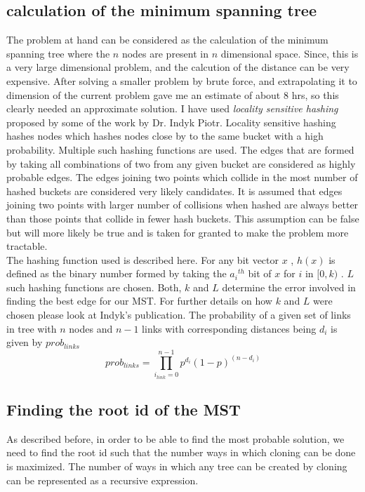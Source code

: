 \documentclass[12pt]{article}
\begin{document}
\subsection{calculation of the minimum spanning tree}
The problem at hand can be considered as the calculation of the minimum spanning tree where the $n$ nodes are present in $n$ dimensional space. Since, this is a very large dimensional problem, and the calcution of the distance can be very expensive. After solving a smaller problem by brute force, and extrapolating it to dimension of the current problem gave me an estimate of about 8 hrs, so this clearly needed an approximate solution. I have used \emph{locality sensitive hashing} proposed by some of the work by Dr. Indyk Piotr. Locality sensitive hashing hashes nodes which hashes nodes close by to the same bucket with a high probability. Multiple such hashing functions are used. The edges that are formed by taking all combinations of two from any given bucket are considered as highly probable edges. The edges joining two points which collide in the most number of hashed buckets are considered very likely candidates. It is assumed that edges joining two points with larger number of collisions when hashed are always better than those points that collide in fewer hash buckets. This assumption can be false but will more likely be true and is taken for granted to make the problem more tractable. \\

The hashing function used is described here. For any bit vector $x$ , $h(x)$ is defined as the binary number formed by taking the ${a_i}^{th}$ bit of $x$ for $i$ in $[0,k)$ . $L$ such hashing functions are chosen. Both, $k$ and $L$ determine the error involved in finding the best edge for our MST. For further details on how $k$ and $L$ were chosen please look at Indyk's publication. The probability of a given set of links in tree with $n$ nodes and $n-1$ links with corresponding distances being $d_i$ is given by $prob_{links}$ \\
\begin{equation}
  prob_{links} = \prod_{i_{link} = 0}^{n-1} p^{d_i}(1-p)^{(n-d_i)}
\end{equation}

\subsection{Finding the root id of the MST}
As described before, in order to be able to find the most probable solution, we need to find the root id such that the number ways in which cloning can be done is maximized. The number of ways in which any tree can be created by cloning can be represented as a recursive expression. \\
\end{document}
